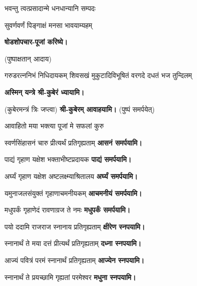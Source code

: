 {भवन्तु त्वत्प्रसादान्मे धनधान्यानि सम्पदः}

{सुवर्णवर्णं पिङ्गाक्षं मनसा भावयाम्यहम्}

\textbf{\devAya{} षोडशोपचार-पूजां करिष्ये।}

\begin{center}
(पुष्पाक्षतान् आदाय)

{गरुडरत्ननिभं निधिदायकम्}
{शिवसखं मुकुटादिविभूषितं}
{वरगदे दधतं भज तुन्दिलम्}

\textbf{\devAya{} अस्मिन् यन्त्रे श्री-कुबेरं ध्यायामि।}

(कुबेरमन्त्रं त्रिः जप्त्वा) \textbf{श्री-कुबेरम् आवाहयामि।} (पुष्पं समर्पयेत्)

{आवाहितो मया भक्त्या पूजां मे सफलां कुरु}

{स्वर्णसिंहासनं चारु प्रीत्यर्थं प्रतिगृह्यताम्}
\textbf{\devAya{} आसनं समर्पयामि।}\medskip

{पाद्यं गृहाण यक्षेश भक्ताभीष्टप्रदायक}
\textbf{\devAya{} पाद्यं समर्पयामि।}\medskip

{अर्घ्यं गृहाण यक्षेश अष्टलक्ष्म्याश्रितालय}
\textbf{\devAya{} अर्घ्यं समर्पयामि।}\medskip

{यमुनाजलसंयुक्तं गृहाणाचमनीयकम्}
\textbf{\devAya{} आचमनीयं समर्पयामि।}\medskip

{मधुपर्कं गृहाणेदं रावणाग्रज ते नमः}
\textbf{\devAya{} मधुपर्कं समर्पयामि।}\medskip

{पयो ददामि राजराज स्नानाय प्रतिगृह्यताम्}
\textbf{\devAya{} क्षीरेण स्नपयामि।}\medskip

{स्नानार्थं ते मया दत्तं प्रीत्यर्थं प्रतिगृह्यताम्}
\textbf{\devAya{} दध्ना स्नपयामि।}\medskip

{आज्यं पवित्रं परमं स्नानार्थं प्रतिगृह्यताम्}
\textbf{\devAya{} आज्येन स्नपयामि।}\medskip

{स्नानार्थं ते प्रयच्छामि गृह्यतां परमेश्वर}
\textbf{\devAya{} मधुना स्नपयामि।}\medskip


\end{center}
